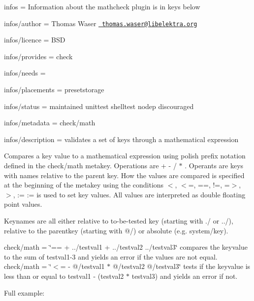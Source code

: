 
\begin{DoxyItemize}
\item infos = Information about the mathcheck plugin is in keys below
\item infos/author = Thomas Waser \href{mailto:thomas.waser@libelektra.org}{\texttt{ thomas.\+waser@libelektra.\+org}}
\item infos/licence = B\+SD
\item infos/provides = check
\item infos/needs =
\item infos/placements = presetstorage
\item infos/status = maintained unittest shelltest nodep discouraged
\item infos/metadata = check/math
\item infos/description = validates a set of keys through a mathematical expression
\end{DoxyItemize}

Compares a key value to a mathematical expression using polish prefix notation defined in the {\ttfamily check/math} metakey. Operations are {\ttfamily + -\/ / $\ast$} . Operants are keys with names relative to the parent key. How the values are compared is specified at the beginning of the metakey using the conditions {\ttfamily $<$, $<$=, ==, !=, =$>$, $>$, \+:=} {\ttfamily \+:=} is used to set key values. All values are interpreted as {\ttfamily double} floating point values.

Keynames are all either relative to to-\/be-\/tested key (starting with {\ttfamily ./} or {\ttfamily ../}), relative to the parentkey (starting with {\ttfamily @/}) or absolute (e.\+g. {\ttfamily system/key}).

{\ttfamily check/math = \char`\"{}== + ../testval1 + ../testval2 ../testval3\char`\"{}} compares the keyvalue to the sum of testval1-\/3 and yields an error if the values are not equal. {\ttfamily check/math = \char`\"{}$<$= -\/ @/testval1 $\ast$ @/testval2 @/testval3\char`\"{}} tests if the keyvalue is less than or equal to {\ttfamily testval1 -\/ (testval2 $\ast$ testval3)} and yields an error if not.

Full example\+:


\begin{DoxyCode}{0}
\DoxyCodeLine{}
\DoxyCodeLine{}
\DoxyCodeLine{}
\end{DoxyCode}



